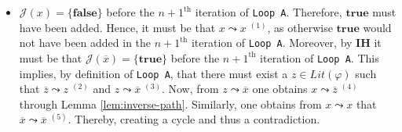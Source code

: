 \documentclass [11pt]{article}
\newcommand{\True}{\mathbf{true}}
\newcommand{\False}{\mathbf{false}}
\newcommand{\lit}{\mathit{Lit}}
\newcommand{\reach}{\leadsto}
\begin{document}
\begin{itemize}
\begin{center}
\begin{tikzpicture}
\end{tikzpicture}
\end{center}
 
 
 
\item $\mathcal{J}(x)=\{\False\}$ before the $n+1^{\text{th}}$ iteration of \texttt{Loop A}. Therefore, $\True$ must have been added. Hence, it must be that $x \reach x\;^{(1)}$, as otherwise $\True$ would not have been added in the $n+1^{\text{th}}$ iteration of \texttt{Loop A}. Moreover, by \textbf{IH} it must be that $\mathcal{J}(\overline{x})=\{\True\}$ before the $n+1^{\text{th}}$ iteration of \texttt{Loop A}. This implies, by definition of \texttt{Loop A}, that there must exist a $z \in \lit(\varphi)$ such that 
$\overline{z} \reach z\; ^{(2)}$ and $z \reach \overline{x}\; ^{(3)}$. Now, from $z \reach \overline{x}$ one obtains $x \reach \overline{z}\;^{(4)}$ 
through Lemma \ref{lem:inverse-path}. Similarly, one obtains from $x \reach x$ that $\overline{x} \reach \overline{x}\;^{(5)}$. Thereby, creating a cycle and thus a contradiction.

\begin{center}
\end{center}
 


\end{itemize}
\end{document}
